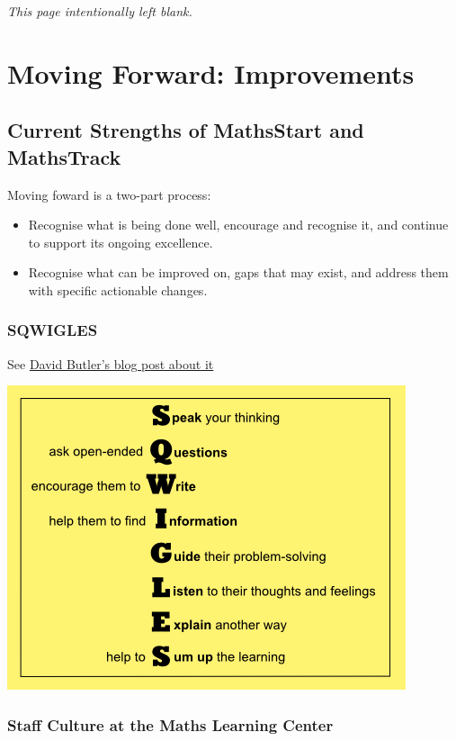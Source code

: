 \documentclass[twoside,12pt,a4paper]{report}
\makeatletter
\newcommand*{\intentionallyblankpage}{
  \vspace*{\fill}
  {\centering \textit{This page intentionally left blank.} \par}
  \vspace{\fill}}
\renewcommand*{\cleardoublepage}{\clearpage\if@twoside \ifodd\c@page\else
  \intentionallyblankpage
  \newpage
  \if@twocolumn\hbox{}\newpage\fi\fi\fi}
\makeatother
\begin{document}
\cleardoublepage
\chapter{Moving Forward: Improvements} 
\label{chap:recommendations}

\lipsum[1]

\section{Current Strengths of MathsStart and MathsTrack}

Moving foward is a two-part process:
\begin{itemize}
	\item Recognise what is being done well, encourage and recognise it, and continue to support its ongoing excellence.
	\item Recognise what can be improved on, gaps that may exist, and address them with specific actionable changes.
\end{itemize}

\subsection{SQWIGLES}

See \href{https://blogs.adelaide.edu.au/maths-learning/2016/09/20/sqwigles/}{David Butler's blog post about it}

\includegraphics{./files/sqwigles.png}



\subsection{Staff Culture at the Maths Learning Center}
\end{document}
